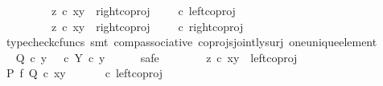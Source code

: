 \begin{isabellebody}
\ \ \ \ \ \ \ \ {\isasymor}\ z\ {\isasymcirc}\isactrlsub c\ {\isasymlangle}x{\isacharcomma}{\kern0pt}y{\isasymrangle}\ {\isacharequal}{\kern0pt}\ right{\isacharunderscore}{\kern0pt}coproj\ {\isasymone}\ {\isacharparenleft}{\kern0pt}{\isasymone}\ {\isasymCoprod}\ {\isasymone}{\isacharparenright}{\kern0pt}\ {\isasymcirc}\isactrlsub c\ left{\isacharunderscore}{\kern0pt}coproj\ {\isasymone}\ {\isasymone}\isanewline
\ \ \ \ \ \ \ \ {\isasymor}\ z\ {\isasymcirc}\isactrlsub c\ {\isasymlangle}x{\isacharcomma}{\kern0pt}y{\isasymrangle}\ {\isacharequal}{\kern0pt}\ right{\isacharunderscore}{\kern0pt}coproj\ {\isasymone}\ {\isacharparenleft}{\kern0pt}{\isasymone}\ {\isasymCoprod}\ {\isasymone}{\isacharparenright}{\kern0pt}\ {\isasymcirc}\isactrlsub c\ right{\isacharunderscore}{\kern0pt}coproj\ {\isasymone}\ {\isasymone}{\isachardoublequoteclose}\isanewline
\ \ \ \ \ \ \isamarkupfalse%
\ {\isacharparenleft}{\kern0pt}typecheck{\isacharunderscore}{\kern0pt}cfuncs{\isacharcomma}{\kern0pt}\ smt\ comp{\isacharunderscore}{\kern0pt}associative{}\ coprojs{\isacharunderscore}{\kern0pt}jointly{\isacharunderscore}{\kern0pt}surj\ one{\isacharunderscore}{\kern0pt}unique{\isacharunderscore}{\kern0pt}element{\isacharparenright}{\kern0pt}\isanewline
\ \ \ \ \isamarkupfalse%
\ \isamarkupfalse%
\ {\isachardoublequoteopen}Q\ {\isasymcirc}\isactrlsub c\ y\ {\isacharequal}{\kern0pt}\ {\isacharparenleft}{\kern0pt}{\isasymt}\ {\isasymcirc}\isactrlsub c\ {\isasymbeta}\isactrlbsub Y\isactrlesub {\isacharparenright}{\kern0pt}\ {\isasymcirc}\isactrlsub c\ y{\isachardoublequoteclose}\isanewline
\ \ \ \ \isamarkupfalse%
\ safe\isanewline
\ \ \ \ \ \ \isamarkupfalse%
\ {\isachardoublequoteopen}z\ {\isasymcirc}\isactrlsub c\ {\isasymlangle}x{\isacharcomma}{\kern0pt}y{\isasymrangle}\ {\isacharequal}{\kern0pt}\ left{\isacharunderscore}{\kern0pt}coproj\ {\isasymone}\ {\isacharparenleft}{\kern0pt}{\isasymone}\ {\isasymCoprod}\ {\isasymone}{\isacharparenright}{\kern0pt}{\isachardoublequoteclose}\isanewline
\ \ \ \ \ \ \isamarkupfalse%
\ \isamarkupfalse%
\ {\isachardoublequoteopen}{\isacharparenleft}{\kern0pt}P\ {\isasymtimes}\isactrlsub f\ Q{\isacharparenright}{\kern0pt}\ {\isasymcirc}\isactrlsub c\ {\isasymlangle}x{\isacharcomma}{\kern0pt}y{\isasymrangle}\ {\isacharequal}{\kern0pt}\ {\isacharparenleft}{\kern0pt}{\isasymlangle}{\isasymt}{\isacharcomma}{\kern0pt}{\isasymt}{\isasymrangle}\ {\isasymamalg}\ {\isasymlangle}{\isasymf}{\isacharcomma}{\kern0pt}{\isasymf}{\isasymrangle}\ {\isasymamalg}\ {\isasymlangle}{\isasymf}{\isacharcomma}{\kern0pt}{\isasymt}{\isasymrangle}{\isacharparenright}{\kern0pt}\ {\isasymcirc}\isactrlsub c\ left{\isacharunderscore}{\kern0pt}coproj\ {\isasymone}\ {\isacharparenleft}{\kern0pt}{\isasymone}\ {\isasymCoprod}\ {\isasymone}{\isacharparenright}{\kern0pt}{\isachardoublequoteclose}\isanewline

\end{isabellebody}

